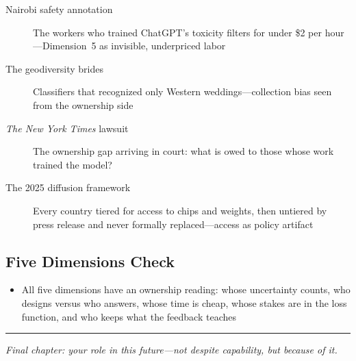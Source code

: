 \begin{description}
  \item[Nairobi safety annotation] The workers who trained ChatGPT's toxicity filters for under \$2 per hour---Dimension~5 as invisible, underpriced labor
  \item[The geodiversity brides] Classifiers that recognized only Western weddings---collection bias seen from the ownership side
  \item[\textit{The New York Times} lawsuit] The ownership gap arriving in court: what is owed to those whose work trained the model?
  \item[The 2025 diffusion framework] Every country tiered for access to chips and weights, then untiered by press release and never formally replaced---access as policy artifact
\end{description}

\subsection*{Five Dimensions Check}

\begin{itemize}
  \item All five dimensions have an ownership reading: whose uncertainty counts, who designs versus who answers, whose time is cheap, whose stakes are in the loss function, and who keeps what the feedback teaches
\end{itemize}

\bigskip
\begin{center}
\rule{0.5\textwidth}{0.4pt}
\end{center}
\bigskip

\noindent\textit{Final chapter: your role in this future---not despite \ai capability, but because of it.}
